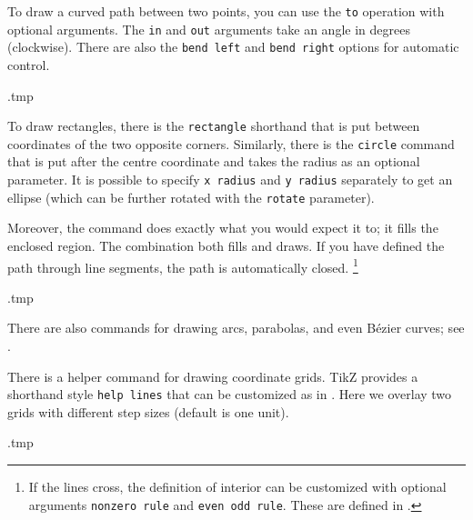 To draw a curved path between two points, you can use the \verb|to| operation
with optional arguments.
The \verb|in| and \verb|out| arguments take an angle in degrees (clockwise).
There are also the \verb|bend left| and \verb|bend right| options
for automatic control.
%
\begin{VerbatimOut}{\jobname.tmp}
\centering
{}
\end{VerbatimOut}
\ShowExampleBelow[2]

To draw rectangles, there is the \verb|rectangle| shorthand
that is put between coordinates of the two opposite corners.
Similarly, there is the \verb|circle| command that is put after the centre coordinate
and takes the radius as an optional parameter.
It is possible to specify \verb|x radius| and \verb|y radius| separately to get an ellipse
(which can be further rotated with the \verb|rotate| parameter).

Moreover, the command  does exactly what you would expect it to;
it fills the enclosed region.
The combination  both fills and draws.
If you have defined the path through line segments,
the path is automatically closed.%
\footnote{If the lines cross, the definition of interior can be customized with optional arguments
\texttt{nonzero rule} and \texttt{even odd rule}.
These are defined in \cite[Section~15.5.2]{tikz}.}
%
\begin{VerbatimOut}{\jobname.tmp}
\centering
{}
\end{VerbatimOut}
\ShowExampleBelow[2]

There are also commands for drawing arcs, parabolas, and even Bézier curves;
see \cite[Section~14]{tikz}.

There is a helper command for drawing coordinate grids.
TikZ provides a shorthand style \verb|help lines|
that can be customized as in .
Here we overlay two grids with different step sizes (default is one unit).
%
\begin{VerbatimOut}{\jobname.tmp}
\centering
{}
\end{VerbatimOut}
\ShowExampleBelow[2]

